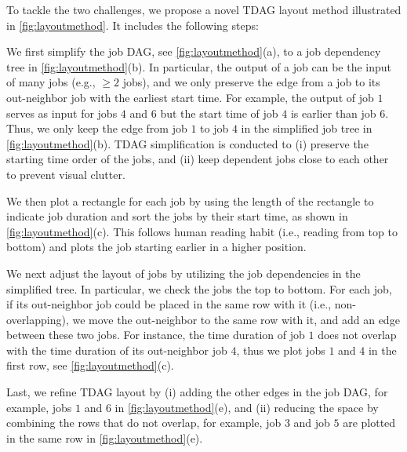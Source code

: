 To tackle the two challenges, we propose a novel TDAG layout method illustrated in \autoref{fig:layoutmethod}. It includes the following steps:

\squishlist
\item {} We first simplify the job DAG, see \autoref{fig:layoutmethod}(a), to a job dependency tree in \autoref{fig:layoutmethod}(b).
In particular, the output of a job can be the input of many jobs (e.g., $\geq 2$ jobs), and we only preserve the edge from a job to its out-neighbor job with the earliest start time.
For example, the output of job $1$ serves as input for jobs $4$ and $6$ but the start time of job $4$ is earlier than job $6$. Thus, we only keep the edge from job $1$ to job $4$ in the simplified job tree in \autoref{fig:layoutmethod}(b).
TDAG simplification is conducted to (i) preserve the starting time order of the jobs, and (ii) keep dependent jobs close to each other to prevent visual clutter.

\item {} We then plot a rectangle for each job by using the length of the rectangle to indicate job duration and sort the jobs by their start time, as shown in \autoref{fig:layoutmethod}(c).
This follows human reading habit (i.e., reading from top to bottom) and plots the job starting earlier in a higher position. 

\item {} We next adjust the layout of jobs by utilizing the job dependencies in the simplified tree. In particular, we check the jobs the top to bottom. For each job, if its out-neighbor job could be placed in the same row with it (i.e., non-overlapping), we move the out-neighbor to the same row with it, and add an edge between these two jobs. 
For instance, the time duration of job $1$ does not overlap with the time duration of its out-neighbor job $4$, thus we plot jobs $1$ and $4$ in the first row, see \autoref{fig:layoutmethod}(c).

\item {}  Last, we refine TDAG layout by (i) adding the other edges in the job DAG, for example, jobs $1$ and $6$ in \autoref{fig:layoutmethod}(e), and (ii) reducing the space by combining the rows that do not overlap, for example, job $3$ and job $5$ are plotted in the same row in \autoref{fig:layoutmethod}(e).
\squishend




